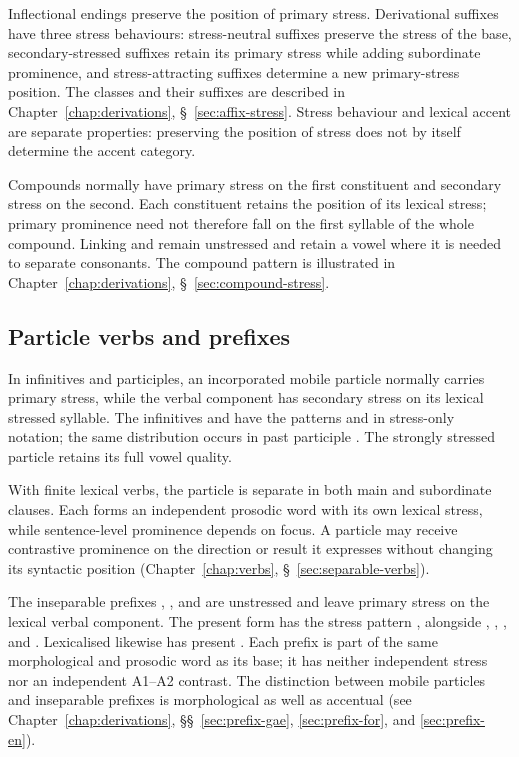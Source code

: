 Inflectional endings preserve the position of primary stress. Derivational suffixes have three stress behaviours: stress-neutral suffixes preserve the stress of the base, secondary-stressed suffixes retain its primary stress while adding subordinate prominence, and stress-attracting suffixes determine a new primary-stress position. The classes and their suffixes are described in Chapter~\ref{chap:derivations}, \S~\ref{sec:affix-stress}. Stress behaviour and lexical accent are separate properties: preserving the position of stress does not by itself determine the accent category.

Compounds normally have primary stress on the first constituent and secondary stress on the second. Each constituent retains the position of its lexical stress; primary prominence need not therefore fall on the first syllable of the whole compound. Linking  and  remain unstressed and retain a vowel where it is needed to separate consonants. The compound pattern is illustrated in Chapter~\ref{chap:derivations}, \S~\ref{sec:compound-stress}.

\subsection{Particle verbs and prefixes}
\label{sec:particle-stress}

In infinitives and participles, an incorporated mobile particle normally carries primary stress, while the verbal component has secondary stress on its lexical stressed syllable. The infinitives  and  have the patterns  and  in stress-only notation; the same distribution occurs in past participle . The strongly stressed particle retains its full vowel quality.

With finite lexical verbs, the particle is separate in both main and subordinate clauses. Each forms an independent prosodic word with its own lexical stress, while sentence-level prominence depends on focus. A particle may receive contrastive prominence on the direction or result it expresses without changing its syntactic position (Chapter~\ref{chap:verbs}, \S~\ref{sec:separable-verbs}).

The inseparable prefixes , , and  are unstressed and leave primary stress on the lexical verbal component. The present form  has the stress pattern , alongside , , , and . Lexicalised  likewise has present . Each prefix is part of the same morphological and prosodic word as its base; it has neither independent stress nor an independent A1--A2 contrast. The distinction between mobile particles and inseparable prefixes is morphological as well as accentual (see Chapter~\ref{chap:derivations}, \S\S~\ref{sec:prefix-gae}, \ref{sec:prefix-for}, and \ref{sec:prefix-en}).


